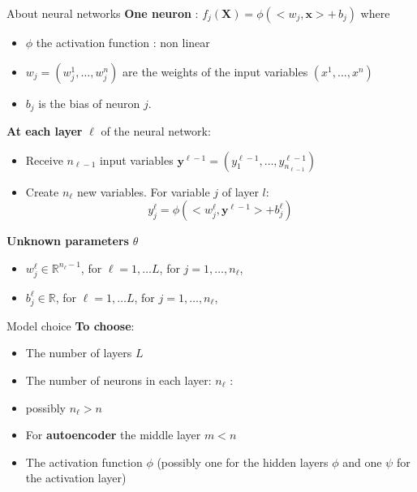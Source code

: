 \documentclass[compress,10pt]{beamer}
\begin{document}



\begin{frame}{About neural networks}
\protect\hypertarget{about-neural-networks}{}
\textbf{One neuron} :
\(f_j (\mathbf{X}) = \phi (<w_j, \mathbf {x}> + \, b_j)\) where

\begin{itemize}
\item
  \(\phi\) the activation function : non linear
\item \(w_j = (w_j^1, \dots, w_j^n)\) are the weights of the
  input variables \((x^1, \dots, x^n)\)
\item
  \(b_j\) is the bias of neuron \(j\).
\end{itemize}

\textbf{At each layer} \(\ell\) of the neural network:

\begin{itemize}
\item
  Receive \(n_{\ell-1}\) input variables
  \(\mathbf{y}^{\ell-1} =(y^{\ell-1}_{1}, \dots,y^{\ell-1}_{n_{\ell-1}})\)
\item
  Create \(n_\ell\) new variables. For variable \(j\) of layer \(l\):
  \[y^{\ell}_{j} = \phi(<w^\ell_j, \mathbf{y}^{\ell-1}>  +  b^{\ell}_j)\]
\end{itemize}

\textbf{Unknown parameters} \(\theta\)
\begin{itemize}
\item  \(w^\ell_j \in \mathbb{R}^{n_\ell-1}\), for \(\ell =1, \dots L\), for
\(j=1,\dots,n_{\ell}\), 
\item \(b^\ell_j \in \mathbb{R}\), for
\(\ell =1, \dots L\), for \(j=1,\dots,n_{\ell}\),
\end{itemize}
\end{frame}



\begin{frame}{Model choice}
\protect\hypertarget{model-choice}{}
\textbf{To choose}:

\begin{itemize}
\item
  The number of layers \(L\)
\item
  The number of neurons in each layer: \(n_\ell\) :
\item
  possibly \(n_\ell > n\)
\item
  For \textbf{autoencoder} the middle layer \(m < n\)
\item
  The activation function \(\phi\) (possibly one for the hidden layers $\phi$ and one $\psi$ for the activation layer)
\end{itemize}
\end{frame}
\end{document}
